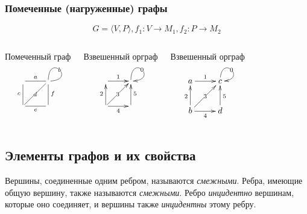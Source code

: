 \begin{frame}
    \frametitle{Помеченные (нагруженные) графы}

    \[
        G=\langle V,P\rangle,f_1:V\to M_1,f_2:P\to M_2
    \]    
    \begin{columns}
            \begin{block}{Помеченный граф}
                \[
                    {\xymatrix{
                        \ar@{-}[r]^{a}
                            &\ar@{-}@(u,r)[]|-{b}
                                \\
                        \ar@{-}[u]^{c} \ar@{-}[ur]|-{d} \ar@{-}[r]_{e}
                            &\ar@{-}[u]_{f}
                    }}
                \]
            \end{block}
            \begin{block}{Взвешенный орграф}
                \[
                    {\xymatrix{
                        \ar@{->}[r]^{1}
                            &\ar@{->}@(u,r)[]|-{0}
                                \\
                        \ar@{->}[u]^{2} \ar@{->}[ur]|-{3} \ar@{->}[r]_{4}
                            &\ar@{->}[u]_{5}
                    }}
                \]
            \end{block}
            \begin{block}{Взвешенный орграф}
                \[
                    {\xymatrix{
                        a \ar@{->}[r]^{1}
                            &c \ar@{->}@(u,r)[]|-{0}
                                \\
                        b \ar@{->}[u]^{2} \ar@{->}[ur]|-{3} \ar@{->}[r]_{4}
                            &d \ar@{->}[u]_{5}
                    }}
                \]
            \end{block}
    \end{columns}
\end{frame}


\subsection{Элементы графов и их свойства}

Вершины, соединенные одним ребром, называются \emph{смежными}. Ребра, имеющие общую вершину, также называются \emph{смежными}. Ребро \emph{инцидентно} вершинам, которые оно соединяет, и вершины также \emph{инцидентны} этому ребру.

